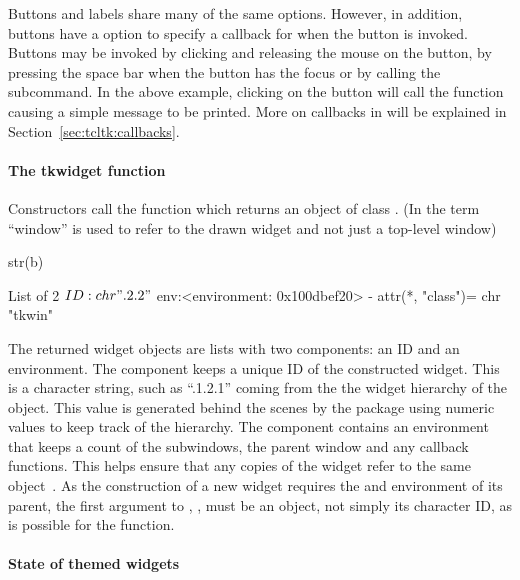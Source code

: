 Buttons and labels share many of the same options. However, in
addition, buttons have a  option to
specify a callback for when the button is invoked. Buttons may be
invoked by clicking and releasing the mouse on the button, by pressing
the space bar when the button has the focus or by calling the
 subcommand. In the above example, clicking on the
button will call the function causing a simple message to be printed. More on callbacks in 
will be explained in Section~\ref{sec:tcltk:callbacks}.

\paragraph{The tkwidget function}
Constructors call the  function which returns an
object of class . (In \TK\/ the term ``window'' is used to
refer to the drawn widget and not just a top-level window)

\begin{Schunk}
\begin{Sinput}
 str(b)
\end{Sinput}
\begin{Soutput}
List of 2
 $ ID : chr ".2.2"
 $ env:<environment: 0x100dbef20> 
 - attr(*, "class")= chr "tkwin"
\end{Soutput}
\end{Schunk}

The returned widget objects are lists with two components: an ID and an
environment. The  component keeps a unique ID of the
constructed widget. This is a character string, such as ``.1.2.1''
coming from the the widget hierarchy of the object. This value is
generated behind the scenes by the  package using numeric
values to keep track of the hierarchy. The  component
contains an environment that keeps a count of the subwindows, the parent
window and any callback functions. This helps ensure that any copies
of the widget refer to the same object~\citep{Dalgaard-DSC}. As the
construction of a new widget requires the  and environment of
its parent, the first argument to , ,
must be an \R\/ \TK\/ object, not simply its character ID, as is
possible for the  function.



\paragraph{State of themed widgets}

